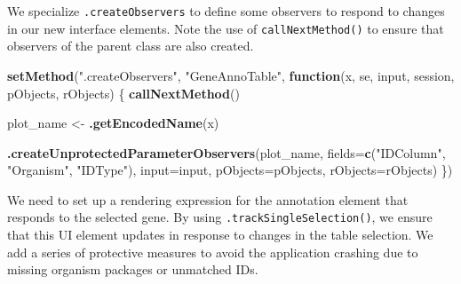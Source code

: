 \documentclass[
]{book}
\newenvironment{Shaded}{\begin{snugshade}}{\end{snugshade}}
\newcommand{\ControlFlowTok}[1]{\textcolor[rgb]{0.13,0.29,0.53}{\textbf{#1}}}
\newcommand{\DataTypeTok}[1]{\textcolor[rgb]{0.13,0.29,0.53}{#1}}
\newcommand{\KeywordTok}[1]{\textcolor[rgb]{0.13,0.29,0.53}{\textbf{#1}}}
\newcommand{\NormalTok}[1]{#1}
\newcommand{\StringTok}[1]{\textcolor[rgb]{0.31,0.60,0.02}{#1}}
\begin{document}
We specialize \texttt{.createObservers} to define some observers to respond to changes in our new interface elements.
Note the use of \texttt{callNextMethod()} to ensure that observers of the parent class are also created.

\begin{Shaded}
\begin{Highlighting}[]
\KeywordTok{setMethod}\NormalTok{(}\StringTok{".createObservers"}\NormalTok{, }\StringTok{"GeneAnnoTable"}\NormalTok{,}
    \ControlFlowTok{function}\NormalTok{(x, se, input, session, pObjects, rObjects)}
\NormalTok{\{}
    \KeywordTok{callNextMethod}\NormalTok{()}

\NormalTok{    plot_name <-}\StringTok{ }\KeywordTok{.getEncodedName}\NormalTok{(x)}

    \KeywordTok{.createUnprotectedParameterObservers}\NormalTok{(plot_name,}
        \DataTypeTok{fields=}\KeywordTok{c}\NormalTok{(}\StringTok{"IDColumn"}\NormalTok{, }\StringTok{"Organism"}\NormalTok{, }\StringTok{"IDType"}\NormalTok{), }
        \DataTypeTok{input=}\NormalTok{input, }\DataTypeTok{pObjects=}\NormalTok{pObjects, }\DataTypeTok{rObjects=}\NormalTok{rObjects)}
\NormalTok{\})}
\end{Highlighting}
\end{Shaded}

We need to set up a rendering expression for the annotation element that responds to the selected gene.
By using \texttt{.trackSingleSelection()}, we ensure that this UI element updates in response to changes in the table selection.
We add a series of protective measures to avoid the application crashing due to missing organism packages or unmatched IDs.
\end{document}
